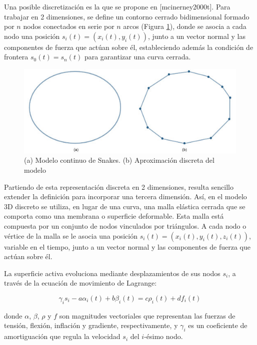 Una posible discretización es la que se propone en \cite{} [mcinerney2000t]. Para trabajar en 2 dimensiones, se define un contorno cerrado bidimensional formado por $n$ nodos conectados en serie por $n$ arcos (Figura \ref{fig:modelo_continuo_snakes}), donde se asocia a cada nodo una posición $s_{i}(t) = (x_{i}(t),y_{i}(t))$, junto a un vector normal y las componentes de fuerza que actúan sobre él, estableciendo además la condición de frontera $s_{0}(t)=s_{n}(t)$ para garantizar una curva cerrada.

\begin{figure}[h!]
	\centering
	\includegraphics[scale=0.6]{images/ovalo_continuo_vs_discreto.jpg}
	\caption{(a) Modelo continuo de Snakes. (b) Aproximación discreta del modelo}
	\label{fig:modelo_continuo_snakes}
\end{figure}

Partiendo de esta representación discreta en 2 dimensiones, resulta sencillo extender la definición para incorporar una tercera dimensión. Así, en el modelo 3D discreto se utiliza, en lugar de una curva, una malla elástica cerrada que se comporta como una membrana o superficie deformable. Esta malla está compuesta por un conjunto de nodos vinculados por triángulos. A cada nodo o vértice de la malla se le asocia una posición $s_{i}(t)=(x_{i}(t),y_{i}(t), z_{i}(t))$, variable en el tiempo, junto a un vector normal y las componentes de fuerza que actúan sobre él.

La superficie activa evoluciona mediante desplazamientos de sus nodos $s_{i}$, a través de la ecuación de movimiento de Lagrange:

$$ \gamma_{i}s_{i} - a\alpha_{i}(t) + b\beta_{i}(t) = c\rho_{i}(t) + df_{i}(t)  $$

donde $\alpha$, $\beta$, $\rho$  y $f$ son magnitudes vectoriales que representan las fuerzas de tensión, flexión, inflación y gradiente, respectivamente, y $\gamma_{i}$ es un coeficiente de amortiguación que regula la velocidad $s_{i}$ del $i$-ésimo nodo.

